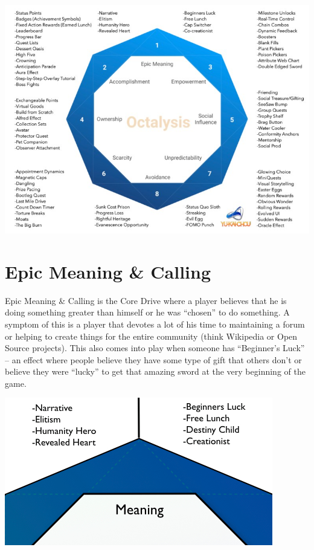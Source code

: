 \documentclass[
]{book}
\begin{document}
\begin{center}\includegraphics[width=0.9\linewidth]{assets/images/octalysis} \end{center}

\hypertarget{epic-meaning-calling}{%
\section{Epic Meaning \& Calling}\label{epic-meaning-calling}}

Epic Meaning \& Calling is the Core Drive where a player believes that he is doing something greater than himself or he was ``chosen'' to do something. A symptom of this is a player that devotes a lot of his time to maintaining a forum or helping to create things for the entire community (think Wikipedia or Open Source projects). This also comes into play when someone has ``Beginner's Luck'' -- an effect where people believe they have some type of gift that others don't or believe they were ``lucky'' to get that amazing sword at the very beginning of the game.

\begin{center}\includegraphics[width=0.75\linewidth]{assets/images/core-drive-1-epic-meaning-and-calling} \end{center}
\end{document}
